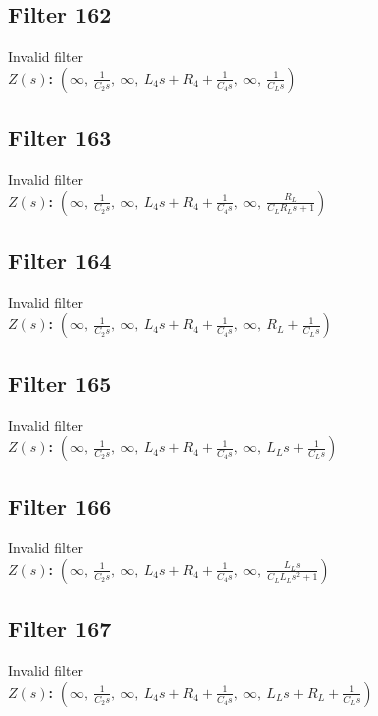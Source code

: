 \documentclass{article}
\begin{document}
\subsection*{Filter 162}
Invalid filter \\ 
\textbf{$Z(s)$:} $\left( \infty, \  \frac{1}{C_{2} s}, \  \infty, \  L_{4} s + R_{4} + \frac{1}{C_{4} s}, \  \infty, \  \frac{1}{C_{L} s}\right)$ \\ 
\subsection*{Filter 163}
Invalid filter \\ 
\textbf{$Z(s)$:} $\left( \infty, \  \frac{1}{C_{2} s}, \  \infty, \  L_{4} s + R_{4} + \frac{1}{C_{4} s}, \  \infty, \  \frac{R_{L}}{C_{L} R_{L} s + 1}\right)$ \\ 
\subsection*{Filter 164}
Invalid filter \\ 
\textbf{$Z(s)$:} $\left( \infty, \  \frac{1}{C_{2} s}, \  \infty, \  L_{4} s + R_{4} + \frac{1}{C_{4} s}, \  \infty, \  R_{L} + \frac{1}{C_{L} s}\right)$ \\ 
\subsection*{Filter 165}
Invalid filter \\ 
\textbf{$Z(s)$:} $\left( \infty, \  \frac{1}{C_{2} s}, \  \infty, \  L_{4} s + R_{4} + \frac{1}{C_{4} s}, \  \infty, \  L_{L} s + \frac{1}{C_{L} s}\right)$ \\ 
\subsection*{Filter 166}
Invalid filter \\ 
\textbf{$Z(s)$:} $\left( \infty, \  \frac{1}{C_{2} s}, \  \infty, \  L_{4} s + R_{4} + \frac{1}{C_{4} s}, \  \infty, \  \frac{L_{L} s}{C_{L} L_{L} s^{2} + 1}\right)$ \\ 
\subsection*{Filter 167}
Invalid filter \\ 
\textbf{$Z(s)$:} $\left( \infty, \  \frac{1}{C_{2} s}, \  \infty, \  L_{4} s + R_{4} + \frac{1}{C_{4} s}, \  \infty, \  L_{L} s + R_{L} + \frac{1}{C_{L} s}\right)$ \\ 
\end{document}
